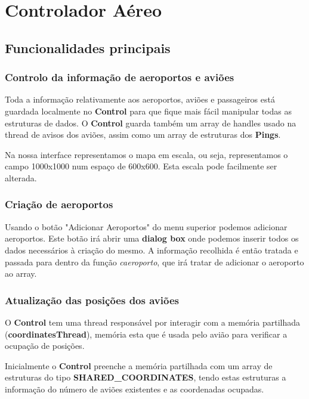 \documentclass[11pt]{article}
\begin{document}
	\section{Controlador Aéreo}
	\subsection{Funcionalidades principais}
	\subsubsection{Controlo da informação de aeroportos e aviões}
	\normalsize
	
    Toda a informação relativamente aos aeroportos, aviões e passageiros está guardada localmente no \textbf{Control} para que fique mais fácil manipular todas as estruturas de dados.
    O \textbf{Control} guarda também um array de handles usado na thread de avisos dos aviões, assim como um array de estruturas dos \textbf{Pings}.
    
    Na nossa interface representamos o mapa em escala, ou seja, representamos o campo 1000x1000 num espaço de 600x600. Esta escala pode facilmente ser alterada.
	
	
	\large
	\subsubsection{Criação de aeroportos}
	\normalsize
	
	Usando o botão "Adicionar Aeroportos" do menu superior podemos adicionar aeroportos. Este botão irá abrir uma \textbf{dialog box} onde podemos inserir todos os dados necessários à criação do mesmo. A informação recolhida é então tratada e passada para dentro da função \textit{caeroporto}, que irá tratar de adicionar o aeroporto ao array.
	
	
	\large
	\subsubsection{Atualização das posições dos aviões}
	\normalsize
	
	O \textbf{Control} tem uma thread responsável por interagir com a memória partilhada (\textbf{coordinatesThread}), memória esta que é usada pelo avião para verificar a ocupação de posições.
	
	Inicialmente o \textbf{Control} preenche a memória partilhada com um array de estruturas do tipo \textbf{SHARED\_COORDINATES}, tendo estas estruturas a informação do número de aviões existentes e as coordenadas ocupadas.
	
\end{document}
